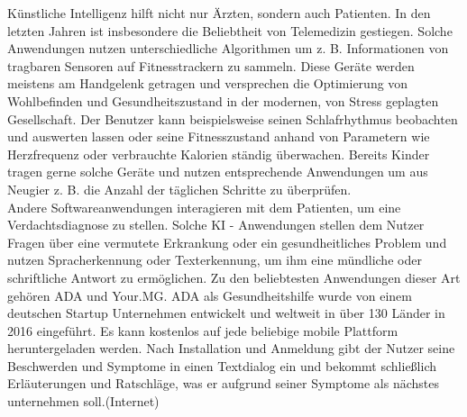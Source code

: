 Künstliche Intelligenz hilft nicht nur Ärzten, sondern auch Patienten.\cite{Opportunities_challenges_ai_hc} In den letzten Jahren ist insbesondere die Beliebtheit von Telemedizin gestiegen. Solche Anwendungen nutzen unterschiedliche Algorithmen um z. B. Informationen von tragbaren Sensoren auf Fitnesstrackern zu sammeln.\cite{Opportunities_challenges_ai_hc} Diese Geräte werden meistens am Handgelenk getragen und versprechen die Optimierung von Wohlbefinden und Gesundheitszustand in der modernen, von Stress geplagten Gesellschaft. Der Benutzer kann beispielsweise seinen Schlafrhythmus beobachten und auswerten lassen oder seine Fitnesszustand anhand von Parametern wie Herzfrequenz oder verbrauchte Kalorien ständig überwachen.\cite{Opportunities_challenges_ai_hc} Bereits Kinder tragen gerne solche Geräte und nutzen entsprechende Anwendungen um aus Neugier z. B. die Anzahl der täglichen Schritte zu überprüfen. \\

Andere Softwareanwendungen interagieren mit dem Patienten, um eine Verdachtsdiagnose zu stellen.\cite{Opportunities_challenges_ai_hc} Solche KI - Anwendungen stellen dem Nutzer Fragen über eine vermutete Erkrankung oder ein gesundheitliches Problem und nutzen Spracherkennung oder Texterkennung, um ihm eine mündliche oder schriftliche Antwort zu ermöglichen.
Zu den beliebtesten Anwendungen dieser Art gehören ADA und Your.MG. ADA als Gesundheitshilfe wurde von einem deutschen Startup Unternehmen entwickelt und weltweit in über 130 Länder in 2016 eingeführt.\cite{Opportunities_challenges_ai_hc} Es kann kostenlos auf jede beliebige mobile Plattform heruntergeladen werden. Nach Installation und Anmeldung gibt der Nutzer seine Beschwerden und Symptome in einen Textdialog ein und bekommt schließlich Erläuterungen und Ratschläge, was er aufgrund seiner Symptome als nächstes unternehmen soll.(Internet)\\
 
